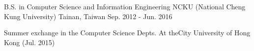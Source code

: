 

\begin{cventries}

  \cventry
    {B.S. in Computer Science and Information Engineering} %
    {NCKU (National Cheng Kung University)} %
    {Tainan, Taiwan} %
    {Sep. 2012 - Jun. 2016} %
    {
      \begin{cvitems} %
        \item {Summer exchange in the Computer Science Depts. At theCity University of Hong Kong (Jul. 2015)}
      \end{cvitems}
    }

\end{cventries}
